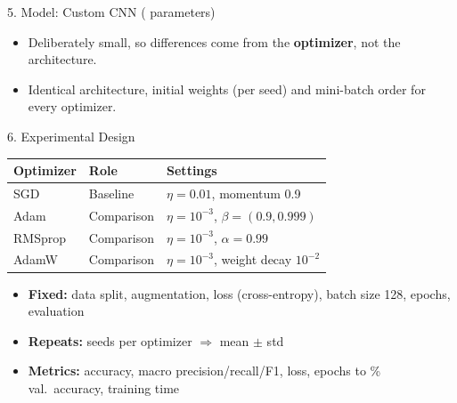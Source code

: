 \documentclass[aspectratio=169,11pt]{beamer}
\begin{document}
\begin{frame}{5. Model: Custom CNN (\nParams{} parameters)}
\centering
{}

\vspace{8pt}
\begin{itemize}
  \item Deliberately small, so differences come from the \textbf{optimizer}, not the architecture.
  \item Identical architecture, initial weights (per seed) and mini-batch order for every optimizer.
\end{itemize}
\end{frame}

\begin{frame}{6. Experimental Design}
\centering\small
\begin{tabular}{lll}
\toprule
\textbf{Optimizer} & \textbf{Role} & \textbf{Settings}\\
\midrule
SGD & Baseline & $\eta{=}0.01$, momentum 0.9\\
Adam & Comparison & $\eta{=}10^{-3}$, $\beta{=}(0.9,0.999)$\\
RMSprop & Comparison & $\eta{=}10^{-3}$, $\alpha{=}0.99$\\
AdamW & Comparison & $\eta{=}10^{-3}$, weight decay $10^{-2}$\\
\bottomrule
\end{tabular}

\vspace{8pt}
\raggedright
\begin{itemize}
  \item \textbf{Fixed:} data split, augmentation, loss (cross-entropy), batch size 128, \nEpochs{} epochs, evaluation
  \item \textbf{Repeats:} \nSeeds{} seeds per optimizer $\Rightarrow$ mean $\pm$ std
  \item \textbf{Metrics:} accuracy, macro precision/recall/F1, loss, epochs to \convThresh\% val.\ accuracy, training time
\end{itemize}
\end{frame}
\end{document}
